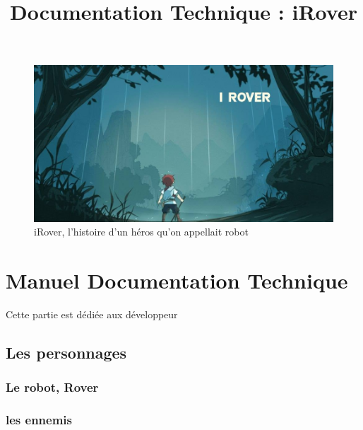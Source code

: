\documentclass[a4paper 12pts]{article}
\title{Documentation Technique : iRover}
\author{}
\begin{document}
\maketitle


\begin{figure}[h]
   \includegraphics[width=350pt]{Illustration/proj_irover.jpg}
	\caption{iRover, l'histoire d'un héros qu'on appellait robot}
\end{figure}



\newpage


\renewcommand{\contentsname}{Sommaire} 
\tableofcontents

\newpage








\section{Manuel Documentation Technique}


\vspace{2cm}

Cette partie est dédiée aux développeur


\subsection{Les personnages}


\subsubsection{Le robot, Rover}

\subsubsection{les ennemis}
\end{document}

